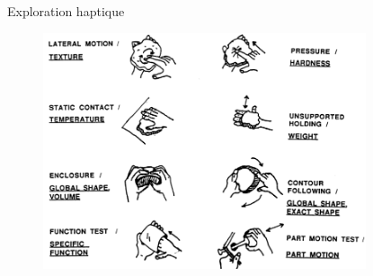 \documentclass[compress, noflama]{beamer}
\begin{document}
{
\begin{frame}{Exploration haptique}
\begin{figure}
\includegraphics[width=9.5cm]{images/hapticExploration}
\end{figure}
\end{frame}
}
\end{document}
